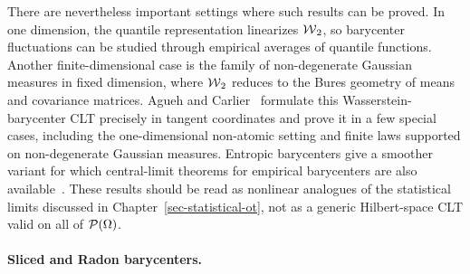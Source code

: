 There are nevertheless important settings where such results can be proved. In one dimension, the quantile representation linearizes $\operatorname{\mathcal{W}}_2$, so barycenter fluctuations can be studied through empirical averages of quantile functions. Another finite-dimensional case is the family of non-degenerate Gaussian measures in fixed dimension, where $\operatorname{\mathcal{W}}_2$ reduces to the Bures geometry of means and covariance matrices. Agueh and Carlier~\cite{agueh2017vers} formulate this Wasserstein-barycenter CLT precisely in tangent coordinates and prove it in a few special cases, including the one-dimensional non-atomic setting and finite laws supported on non-degenerate Gaussian measures. Entropic barycenters give a smoother variant for which central-limit theorems for empirical barycenters are also available~\cite{CarlierEichingerKroshnin2020EntropicBarycenterCLT}. These results should be read as nonlinear analogues of the statistical limits discussed in Chapter~\ref{sec-statistical-ot}, not as a generic Hilbert-space CLT valid on all of $\mathcal{P}(\Omega)$.

\paragraph{Sliced and Radon barycenters.}

